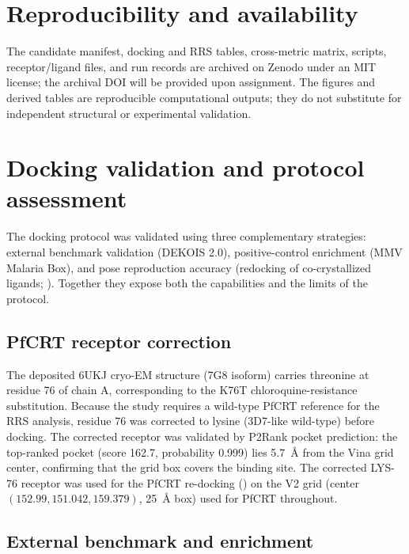 \documentclass[journal=jcisd8,manuscript=suppinfo]{achemso}
\begin{document}
\section{Reproducibility and availability}\label{sec:sm_repro}
The candidate manifest, docking and RRS tables, cross-metric matrix, scripts, receptor/ligand files, and run records are archived on Zenodo under an MIT license; the archival DOI will be provided upon assignment. The figures and derived tables are reproducible computational outputs; they do not substitute for independent structural or experimental validation.

\section{Docking validation and protocol assessment}\label{sec:sm_validation}
The docking protocol was validated using three complementary strategies: external benchmark validation (DEKOIS 2.0), positive-control enrichment (MMV Malaria Box), and pose reproduction accuracy (redocking of co-crystallized ligands; ). Together they expose both the capabilities and the limits of the protocol.

\subsection{PfCRT receptor correction}\label{sec:sm_val_crt}
The deposited 6UKJ cryo-EM structure (7G8 isoform) carries threonine at residue 76 of chain A, corresponding to the K76T chloroquine-resistance substitution. Because the study requires a wild-type PfCRT reference for the RRS analysis, residue 76 was corrected to lysine (3D7-like wild-type) before docking. The corrected receptor was validated by P2Rank pocket prediction: the top-ranked pocket (score 162.7, probability 0.999) lies \qty{5.7}{\angstrom} from the Vina grid center, confirming that the grid box covers the binding site. The corrected LYS-76 receptor was used for the PfCRT re-docking () on the V2 grid (center $(\num{152.99}, \num{151.042}, \num{159.379})$, \qty{25}{\angstrom} box) used for PfCRT throughout.

\subsection{External benchmark and enrichment}\label{sec:sm_val_dekois}

\end{document}
